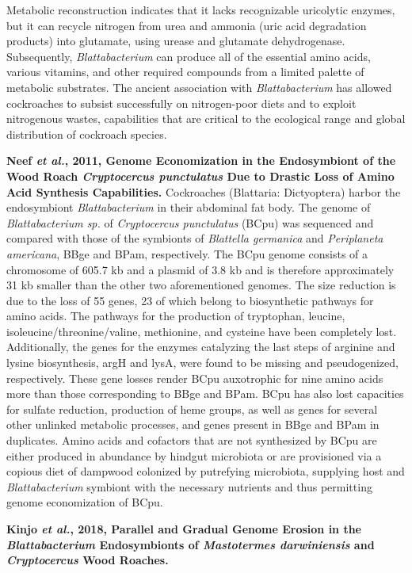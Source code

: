 \documentclass[11pt]{article}
\begin{document}
\begin{sloppypar}
Metabolic reconstruction indicates that it lacks recognizable uricolytic enzymes, but it can recycle nitrogen from urea and ammonia (uric acid degradation products) into glutamate, using urease and glutamate dehydrogenase. 
Subsequently, \textit{Blattabacterium} can produce all of the essential amino acids, various vitamins, and other required compounds from a limited palette of metabolic substrates. 
The ancient association with \textit{Blattabacterium} has allowed cockroaches to subsist successfully on nitrogen-poor diets and to exploit nitrogenous wastes, capabilities that are critical to the ecological range and global distribution of cockroach species.
\par
\textbf{Neef \textit{et al.}, 2011, Genome Economization in the Endosymbiont of the Wood Roach \textit{Cryptocercus punctulatus} Due to Drastic Loss of Amino Acid Synthesis Capabilities.} \newline
Cockroaches (Blattaria: Dictyoptera) harbor the endosymbiont \textit{Blattabacterium} in their abdominal fat body. 
The genome of \textit{Blattabacterium sp.} of \textit{Cryptocercus punctulatus} (BCpu) was sequenced and compared with those of the symbionts of \textit{Blattella germanica} and \textit{Periplaneta americana}, BBge and BPam, respectively. 
The BCpu genome consists of a chromosome of 605.7 kb and a plasmid of 3.8 kb and is therefore approximately 31 kb smaller than the other two aforementioned genomes. 
The size reduction is due to the loss of 55 genes, 23 of which belong to biosynthetic pathways for amino acids. 
The pathways for the production of tryptophan, leucine, isoleucine/threonine/valine, methionine, and cysteine have been completely lost. 
Additionally, the genes for the enzymes catalyzing the last steps of arginine and lysine biosynthesis, argH and lysA, were found to be missing and pseudogenized, respectively. 
These gene losses render BCpu auxotrophic for nine amino acids more than those corresponding to BBge and BPam. 
BCpu has also lost capacities for sulfate reduction, production of heme groups, as well as genes for several other unlinked metabolic processes, and genes present in BBge and BPam in duplicates. 
Amino acids and cofactors that are not synthesized by BCpu are either produced in abundance by hindgut microbiota or are provisioned via a copious diet of dampwood colonized by putrefying microbiota, supplying host and \textit{Blattabacterium} symbiont with the necessary nutrients and thus permitting genome economization of BCpu.
\par
\textbf{Kinjo \textit{et al.}, 2018, Parallel and Gradual Genome Erosion in the \textit{Blattabacterium} Endosymbionts of \textit{Mastotermes darwiniensis} and \textit{Cryptocercus} Wood Roaches.} \newline

\end{sloppypar}
\end{document}
